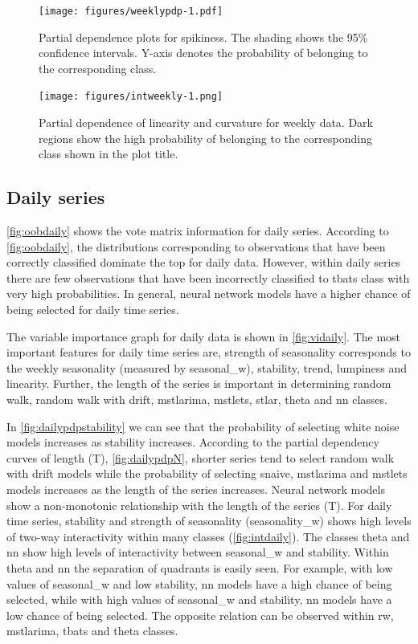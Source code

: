 \documentclass[11pt,a4paper,]{article}
\begin{document}
\begin{figure}
\centering
\texttt{[image: figures/weeklypdp-1.pdf]}
\caption{\label{fig:weeklypdp}Partial dependence plots for spikiness. The shading shows the 95\% confidence intervals. Y-axis denotes the probability of belonging to the corresponding class.}
\end{figure}

\begin{figure}
\centering
\texttt{[image: figures/intweekly-1.png]}
\caption{\label{fig:intweekly}Partial dependence of linearity and curvature for weekly data. Dark regions show the high probability of belonging to the corresponding class shown in the plot title.}
\end{figure}

\hypertarget{daily-series}{%
\subsection{Daily series}\label{daily-series}}

\autoref{fig:oobdaily} shows the vote matrix information for daily series. According to \autoref{fig:oobdaily}, the distributions corresponding to observations that have been correctly classified dominate the top for daily data. However, within daily series there are few observations that have been incorrectly classified to tbats class with very high probabilities. In general, neural network models have a higher chance of being selected for daily time series.

The variable importance graph for daily data is shown in \autoref{fig:vidaily}. The most important features for daily time series are, strength of seasonality corresponds to the weekly seasonality (measured by seasonal\_w), stability, trend, lumpiness and linearity. Further, the length of the series is important in determining random walk, random walk with drift, mstlarima, mstlets, stlar, theta and nn classes.

In \autoref{fig:dailypdpstability} we can see that the probability of selecting white noise models increases as stability increases. According to the partial dependency curves of length (T),
\autoref{fig:dailypdpN}, shorter series tend to select random walk with drift models while the probability of selecting snaive, mstlarima and mstlets models increases as the length of the series increases. Neural network models show a non-monotonic relationship with the length of the series (T). For daily time series, stability and strength of seasonality (seasonality\_w) shows high levels of two-way interactivity within many classes (\autoref{fig:intdaily}). The classes theta and nn show high levels of interactivity between seasonal\_w and stability. Within theta and nn the separation of quadrants is easily seen. For example, with low values of seasonal\_w and low stability, nn models have a high chance of being selected, while with high values of seasonal\_w and stability, nn models have a low chance of being selected. The opposite relation can be observed within rw, mstlarima, tbats and theta classes.
\end{document}
